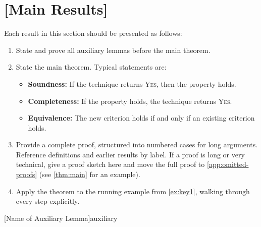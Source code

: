 \begin{example}\label{ex:key1}

\end{example}


\section{[Main Results]}\label{sec:main-results}

Each result in this section should be presented as follows:
\begin{enumerate}
    \item State and prove all auxiliary lemmas before the main theorem.
    \item State the main theorem.  Typical statements are:
          \begin{itemize}
              \item \textbf{Soundness:} If the technique returns \textsc{Yes},
                    then the property holds.
              \item \textbf{Completeness:} If the property holds, the technique
                    returns \textsc{Yes}.
              \item \textbf{Equivalence:} The new criterion holds if and only if
                    an existing criterion holds.
          \end{itemize}
    \item Provide a complete proof, structured into numbered cases for long
          arguments.  Reference definitions and earlier results by label.
          If a proof is long or very technical, give a proof sketch here and
          move the full proof to \cref{app:omitted-proofs}
          (see \cref{thm:main} for an example).
    \item Apply the theorem to the running example from \cref{ex:key1},
          walking through every step explicitly.
\end{enumerate}

\begin{Lemma}{[Name of Auxiliary Lemma]}{auxiliary}

\end{Lemma}

